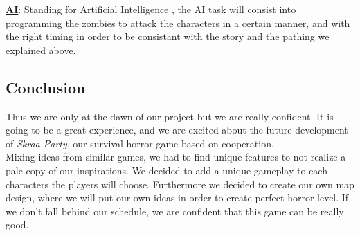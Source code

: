 \documentclass[12pt]{article}
\begin{document}
\underline{\textbf{AI}}: Standing for \guillemotleft \space Artificial Intelligence \guillemotright, the AI task will consist into programming the zombies to attack the characters in a certain manner, and with the right timing in order to be consistant with the story and the pathing we explained above.

\subsection{Conclusion}
Thus we are only at the dawn of our project but we are really confident. It is going to be a great experience, and we are excited about the future development of \textit{Skraa Party}, our survival-horror game based on cooperation.\\

Mixing ideas from similar games, we had to find unique features to not realize a pale copy of our inspirations. We decided to add a unique gameplay to each characters the players will choose. Furthermore we decided to create our own map design, where we will put our own ideas in order to create perfect horror level. If we don't fall behind our schedule, we are confident that this game can be really good.


\newpage
\end{document}
